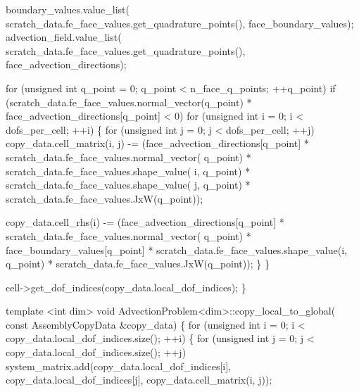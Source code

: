 \begin{DoxyCodeInclude}
            boundary\_values.value\_list(
                scratch\_data.fe\_face\_values.get\_quadrature\_points(),
                face\_boundary\_values);
            advection\_field.value\_list(
                scratch\_data.fe\_face\_values.get\_quadrature\_points(),
                face\_advection\_directions);

            \textcolor{keywordflow}{for} (\textcolor{keywordtype}{unsigned} \textcolor{keywordtype}{int} q\_point = 0; q\_point < n\_face\_q\_points; ++q\_point)
                \textcolor{keywordflow}{if} (scratch\_data.fe\_face\_values.normal\_vector(q\_point) *
                        face\_advection\_directions[q\_point] <
                    0)
                    \textcolor{keywordflow}{for} (\textcolor{keywordtype}{unsigned} \textcolor{keywordtype}{int} i = 0; i < dofs\_per\_cell; ++i) \{
                        \textcolor{keywordflow}{for} (\textcolor{keywordtype}{unsigned} \textcolor{keywordtype}{int} j = 0; j < dofs\_per\_cell; ++j)
                            copy\_data.cell\_matrix(i, j) -=
                                (face\_advection\_directions[q\_point] *
                                 scratch\_data.fe\_face\_values.normal\_vector(
                                     q\_point) *
                                 scratch\_data.fe\_face\_values.shape\_value(
                                     i, q\_point) *
                                 scratch\_data.fe\_face\_values.shape\_value(
                                     j, q\_point) *
                                 scratch\_data.fe\_face\_values.JxW(q\_point));

                        copy\_data.cell\_rhs(i) -=
                            (face\_advection\_directions[q\_point] *
                             scratch\_data.fe\_face\_values.normal\_vector(
                                 q\_point) *
                             face\_boundary\_values[q\_point] *
                             scratch\_data.fe\_face\_values.shape\_value(i,
                                                                     q\_point) *
                             scratch\_data.fe\_face\_values.JxW(q\_point));
                    \}
        \}


    cell->get\_dof\_indices(copy\_data.local\_dof\_indices);
\}


\textcolor{keyword}{template} <\textcolor{keywordtype}{int} dim>
\textcolor{keywordtype}{void} AdvectionProblem<dim>::copy\_local\_to\_global(
    \textcolor{keyword}{const} AssemblyCopyData &copy\_data)
\{
    \textcolor{keywordflow}{for} (\textcolor{keywordtype}{unsigned} \textcolor{keywordtype}{int} i = 0; i < copy\_data.local\_dof\_indices.size(); ++i) \{
        \textcolor{keywordflow}{for} (\textcolor{keywordtype}{unsigned} \textcolor{keywordtype}{int} j = 0; j < copy\_data.local\_dof\_indices.size(); ++j)
            system\_matrix.add(copy\_data.local\_dof\_indices[i],
                              copy\_data.local\_dof\_indices[j],
                              copy\_data.cell\_matrix(i, j));


\end{DoxyCodeInclude}
